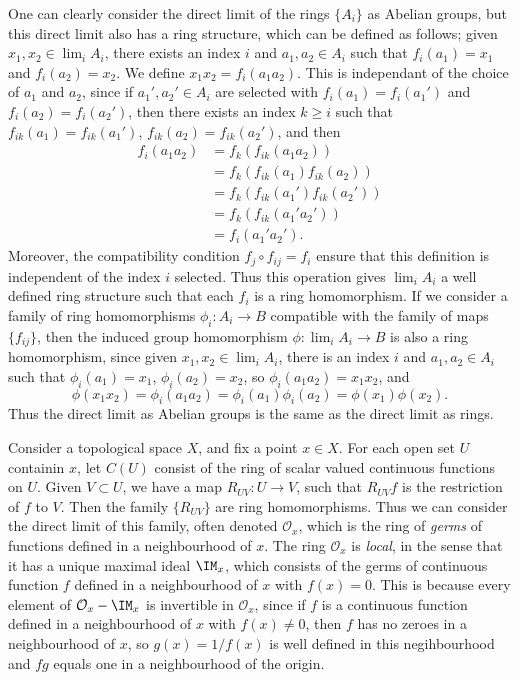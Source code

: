 One can clearly consider the direct limit of the rings $\{ A_i \}$ as Abelian groups, but this direct limit also has a ring structure, which can be defined as follows; given $x_1, x_2 \in \lim_i A_i$, there exists an index $i$ and $a_1, a_2 \in A_i$ such that $f_i(a_1) = x_1$ and $f_i(a_2) = x_2$. We define $x_1x_2 = f_i(a_1a_2)$. This is independant of the choice of $a_1$ and $a_2$, since if $a_1', a_2' \in A_i$ are selected with $f_i(a_1) = f_i(a_1')$ and $f_i(a_2) = f_i(a_2')$, then there exists an index $k \geq i$ such that $f_{ik}(a_1) = f_{ik}(a_1')$, $f_{ik}(a_2) = f_{ik}(a_2')$, and then
%
\begin{align*}
    f_i(a_1a_2) &= f_k(f_{ik}(a_1a_2))\\
    &= f_k(f_{ik}(a_1) f_{ik}(a_2))\\
    &= f_k(f_{ik}(a_1') f_{ik}(a_2'))\\
    &= f_k(f_{ik}(a_1'a_2'))\\
    &= f_i(a_1'a_2').
\end{align*}
%
Moreover, the compatibility condition $f_j \circ f_{ij} = f_i$ ensure that this definition is independent of the index $i$ selected. Thus this operation gives $\lim_i A_i$ a well defined ring structure such that each $f_i$ is a ring homomorphism. If we consider a family of ring homomorphisms $\phi_i: A_i \to B$ compatible with the family of maps $\{ f_{ij} \}$, then the induced group homomorphism $\phi: \lim_i A_i \to B$ is also a ring homomorphism, since given $x_1,x_2 \in \lim_i A_i$, there is an index $i$ and $a_1,a_2 \in A_i$ such that $\phi_i(a_1) = x_1$, $\phi_i(a_2) = x_2$, so $\phi_i(a_1a_2) = x_1x_2$, and
%
\[ \phi(x_1x_2) = \phi_i(a_1a_2) = \phi_i(a_1) \phi_i(a_2) = \phi(x_1) \phi(x_2). \]
%
Thus the direct limit as Abelian groups is the same as the direct limit as rings.

\begin{example}
    Consider a topological space $X$, and fix a point $x \in X$. For each open set $U$ containin $x$, let $C(U)$ consist of the ring of scalar valued continuous functions on $U$. Given $V \subset U$, we have a map $R_{UV}: U \to V$, such that $R_{UV}f$ is the restriction of $f$ to $V$. Then the family $\{ R_{UV} \}$ are ring homomorphisms. Thus we can consider the direct limit of this family, often denoted $\mathcal{O}_x$, which is the ring of \emph{germs} of functions defined in a neighbourhood of $x$. The ring $\mathcal{O}_x$ is \emph{local}, in the sense that it has a unique maximal ideal $\IM_x$, which consists of the germs of continuous function $f$ defined in a neighbourhood of $x$ with $f(x) = 0$. This is because every element of $\mathcal{O}_x - \IM_x$ is invertible in $\mathcal{O}_x$, since if $f$ is a continuous function defined in a neighbourhood of $x$ with $f(x) \neq 0$, then $f$ has no zeroes in a neighbourhood of $x$, so $g(x) = 1/f(x)$ is well defined in this negihbourhood and $fg$ equals one in a neighbourhood of the origin.
\end{example}

